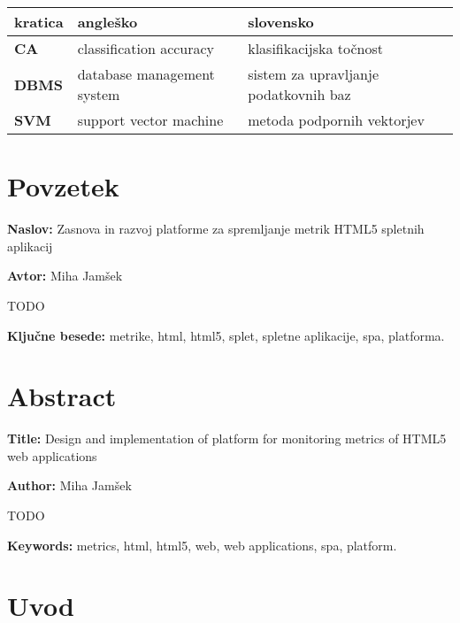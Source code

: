\documentclass[a4paper, 12pt]{book}
\newcommand{\ttitle}{Zasnova in razvoj platforme za spremljanje metrik HTML5 spletnih aplikacij}
\newcommand{\ttitleEn}{Design and implementation of platform for monitoring metrics of HTML5 web applications}
\newcommand{\tauthor}{Miha Jamšek}
\newcommand{\tkeywords}{metrike, html, html5, splet, spletne aplikacije, spa, platforma}
\newcommand{\tkeywordsEn}{metrics, html, html5, web, web applications, spa, platform}
\newcommand{\clearemptydoublepage}{\newpage{\pagestyle{empty}\cleardoublepage}}
\begin{document}
\noindent\begin{tabular}{p{}|p{}|p{}}    %
  {\bf kratica} & {\bf angleško}                             & {\bf slovensko} \\ \hline
  {\bf CA}      & classification accuracy               & klasifikacijska točnost \\
  {\bf DBMS} & database management system & sistem za upravljanje podatkovnih baz \\
  {\bf SVM}   & support vector machine              & metoda podpornih vektorjev \\
\end{tabular}


\clearemptydoublepage

\chapter*{Povzetek}

\noindent\textbf{Naslov:} \ttitle
\bigskip

\noindent\textbf{Avtor:} \tauthor
\bigskip

\noindent TODO

\bigskip

\noindent\textbf{Ključne besede:} \tkeywords.
\clearemptydoublepage

\chapter*{Abstract}

\noindent\textbf{Title:} \ttitleEn
\bigskip

\noindent\textbf{Author:} \tauthor
\bigskip

\noindent TODO
\bigskip

\noindent\textbf{Keywords:} \tkeywordsEn.
\clearemptydoublepage

\mainmatter
\setcounter{page}{1}
\pagestyle{fancy}

\chapter{Uvod}
\end{document}
